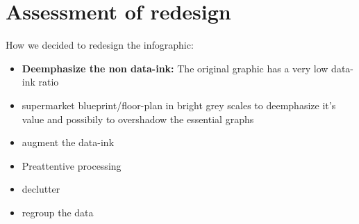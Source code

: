 \section{Assessment of redesign}

How we decided to redesign the infographic:

\begin{itemize}
	\item \textbf{Deemphasize the non data-ink:} The original graphic has a very low data-ink ratio
    \item supermarket blueprint/floor-plan in bright grey scales to deemphasize
		it's value and possibily to overshadow the essential graphs
	\item augment the data-ink
    \item Preattentive processing
	\item declutter
	\item regroup the data
\end{itemize}

